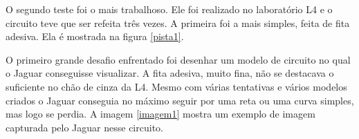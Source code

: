 	\begin{figure}[H]
		\centering
\end{figure}

O segundo teste foi o mais trabalhoso. Ele foi realizado no laboratório L4 e o circuito teve que ser refeita três vezes. A primeira foi a mais simples, feita de fita adesiva. Ela é mostrada na figura \ref{pista1}.

	\begin{figure}[H]
		\centering
\end{figure}

O primeiro grande desafio enfrentado foi desenhar um modelo de circuito no qual o Jaguar conseguisse visualizar. A fita adesiva, muito fina, não se destacava o suficiente no chão de cinza da L4. Mesmo com várias tentativas e vários modelos criados o Jaguar conseguia no máximo seguir por uma reta ou uma curva simples, mas logo se perdia. A imagem \ref{imagem1} mostra um exemplo de imagem capturada pelo Jaguar nesse circuito.

